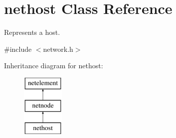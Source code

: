 \hypertarget{classnethost}{\section{nethost Class Reference}
\label{classnethost}
}


Represents a host.  




{\ttfamily \#include $<$network.\-h$>$}

Inheritance diagram for nethost\-:\begin{figure}[H]
\begin{center}
\leavevmode
\includegraphics[height=3.000000cm]{classnethost}
\end{center}
\end{figure}
